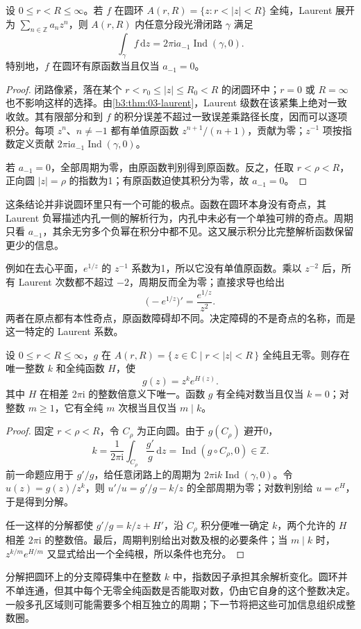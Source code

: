 \begin{proposition}\label{b3:prop:10-annulus-period}
设 \(0\le r<R\le\infty\)。若 \(f\) 在圆环 \(A(r,R)=\{z:r<|z|<R\}\) 全纯，Laurent 展开为 \(\sum_{n\in\mathbb Z}a_nz^n\)，则 \(A(r,R)\) 内任意分段光滑闭路 \(\gamma\) 满足
\[
 \int_\gamma f\,\mathrm{d}z=2\pi\mathrm{i}a_{-1}\operatorname{Ind}(\gamma,0).
\]
特别地，\(f\) 在圆环有原函数当且仅当 \(a_{-1}=0\)。
\end{proposition}
\begin{proof}
闭路像紧，落在某个 \(r<r_0\le |z|\le R_0<R\) 的闭圆环中；\(r=0\) 或 \(R=\infty\) 也不影响这样的选择。由\cref{b3:thm:03-laurent}，Laurent 级数在该紧集上绝对一致收敛。其有限部分和到 \(f\) 的积分误差不超过一致误差乘路径长度，因而可以逐项积分。每项 \(z^n\)、\(n\ne-1\) 都有单值原函数 \(z^{n+1}/(n+1)\)，贡献为零；\(z^{-1}\) 项按指数定义贡献 \(2\pi\mathrm{i}a_{-1}\operatorname{Ind}(\gamma,0)\)。

若 \(a_{-1}=0\)，全部周期为零，由原函数判别得到原函数。反之，任取 \(r<\rho<R\)，正向圆 \(|z|=\rho\) 的指数为1；有原函数迫使其积分为零，故 \(a_{-1}=0\)。
\end{proof}
这条结论并非说圆环里只有一个可能的极点。函数在圆环本身没有奇点，其 Laurent 负幂描述内孔一侧的解析行为，内孔中未必有一个单独可辨的奇点。周期只看 \(a_{-1}\)，其余无穷多个负幂在积分中都不见。这又展示积分比完整解析函数保留更少的信息。

\ProseParagraphBreak
例如在去心平面，\(e^{1/z}\) 的 \(z^{-1}\) 系数为1，所以它没有单值原函数。乘以 \(z^{-2}\) 后，所有 Laurent 次数都不超过 \(-2\)，周期反而全为零；直接求导也给出
\[
 \bigl(-e^{1/z}\bigr)'=\frac{e^{1/z}}{z^2}.
\]
两者在原点都有本性奇点，原函数障碍却不同。决定障碍的不是奇点的名称，而是这一特定的 Laurent 系数。

\begin{corollary}[圆环上无零函数的分解]\label{b3:cor:10-annulus-nonvanishing}
设 \(0\le r<R\le\infty\)，\(g\) 在 \(A(r,R)=\{\,z\in\mathbb C\mid r<|z|<R\,\}\) 全纯且无零。则存在唯一整数 \(k\) 和全纯函数 \(H\)，使
\[
 g(z)=z^k e^{H(z)}.
\]
其中 \(H\) 在相差 \(2\pi\mathrm{i}\) 的整数倍意义下唯一。函数 \(g\) 有全纯对数当且仅当 \(k=0\)；对整数 \(m\ge1\)，它有全纯 \(m\) 次根当且仅当 \(m\mid k\)。
\end{corollary}
\begin{proof}
固定 \(r<\rho<R\)，令 \(C_\rho\) 为正向圆。由于 \(g(C_\rho)\) 避开0，
\[
 k=\frac1{2\pi\mathrm{i}}\int_{C_\rho}\frac{g'}g\,\mathrm{d}z
 =\operatorname{Ind}(g\circ C_\rho,0)\in\mathbb Z.
\]
前一命题应用于 \(g'/g\)，给任意闭路上的周期为 \(2\pi\mathrm{i}k\operatorname{Ind}(\gamma,0)\)。令 \(u(z)=g(z)/z^k\)，则 \(u'/u=g'/g-k/z\) 的全部周期为零；对数判别给 \(u=e^H\)，于是得到分解。

任一这样的分解都使 \(g'/g=k/z+H'\)，沿 \(C_\rho\) 积分便唯一确定 \(k\)，两个允许的 \(H\) 相差 \(2\pi\mathrm{i}\) 的整数倍。最后，周期判别给出对数及根的必要条件；当 \(m\mid k\) 时，\(z^{k/m}e^{H/m}\) 又显式给出一个全纯根，所以条件也充分。
\end{proof}
分解把圆环上的分支障碍集中在整数 \(k\) 中，指数因子承担其余解析变化。圆环并不单连通，但其中每个无零全纯函数是否能取对数，仍由它自身的这个整数决定。一般多孔区域则可能需要多个相互独立的周期；下一节将把这些可加信息组织成整数圈。
